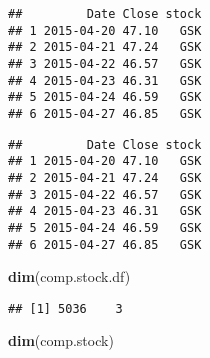 \documentclass[
]{article}
\newenvironment{Shaded}{\begin{snugshade}}{\end{snugshade}}
\newcommand{\CommentTok}[1]{\textcolor[rgb]{0.56,0.35,0.01}{\textit{#1}}}
\newcommand{\ControlFlowTok}[1]{\textcolor[rgb]{0.13,0.29,0.53}{\textbf{#1}}}
\newcommand{\DataTypeTok}[1]{\textcolor[rgb]{0.13,0.29,0.53}{#1}}
\newcommand{\DecValTok}[1]{\textcolor[rgb]{0.00,0.00,0.81}{#1}}
\newcommand{\KeywordTok}[1]{\textcolor[rgb]{0.13,0.29,0.53}{\textbf{#1}}}
\newcommand{\NormalTok}[1]{#1}
\newcommand{\OperatorTok}[1]{\textcolor[rgb]{0.81,0.36,0.00}{\textbf{#1}}}
\newcommand{\StringTok}[1]{\textcolor[rgb]{0.31,0.60,0.02}{#1}}
\begin{document}
\begin{verbatim}
##         Date Close stock
## 1 2015-04-20 47.10   GSK
## 2 2015-04-21 47.24   GSK
## 3 2015-04-22 46.57   GSK
## 4 2015-04-23 46.31   GSK
## 5 2015-04-24 46.59   GSK
## 6 2015-04-27 46.85   GSK
\end{verbatim}

\begin{Shaded}
\end{Shaded}

\begin{verbatim}
##         Date Close stock
## 1 2015-04-20 47.10   GSK
## 2 2015-04-21 47.24   GSK
## 3 2015-04-22 46.57   GSK
## 4 2015-04-23 46.31   GSK
## 5 2015-04-24 46.59   GSK
## 6 2015-04-27 46.85   GSK
\end{verbatim}

\begin{Shaded}
\begin{Highlighting}[]
      \KeywordTok{dim}\NormalTok{(comp.stock.df)}
\end{Highlighting}
\end{Shaded}

\begin{verbatim}
## [1] 5036    3
\end{verbatim}

\begin{Shaded}
\begin{Highlighting}[]
      \KeywordTok{dim}\NormalTok{(comp.stock)}
\end{Highlighting}
\end{Shaded}
\end{document}
